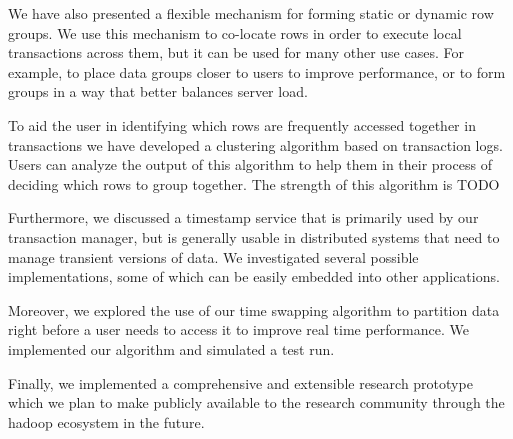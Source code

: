 \documentclass[10pt,final,journal]{IEEEtran}
\begin{document}
We have also presented a flexible mechanism for forming static or dynamic row groups. We use this mechanism to co-locate rows in order to execute local transactions across them, but it can be used for many other use cases. For example, to place data groups closer to users to improve performance, or to form groups in a way that better balances server load.

To aid the user in identifying which rows are frequently accessed together in transactions we have developed a clustering algorithm based on transaction logs. Users can analyze the output of this algorithm to help them in their process of deciding which rows to group together. The strength of this algorithm is TODO

Furthermore, we discussed a timestamp service that is primarily used by our transaction manager, but is generally usable in distributed systems that need to manage transient versions of data. We investigated several possible implementations, some of which can be easily embedded into other applications.

Moreover, we explored the use of our time swapping algorithm to partition data right before a user needs to access it to improve real time performance.
We implemented our algorithm and simulated a test run.

Finally, we implemented a comprehensive and extensible research prototype which we plan to make publicly available to the research community through the hadoop ecosystem in the future.




\end{document}
